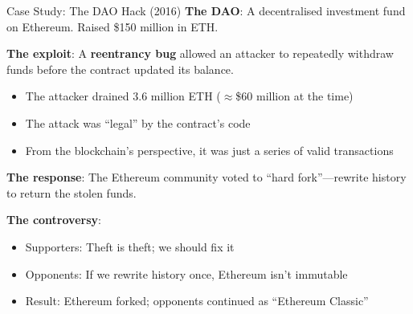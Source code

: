 \documentclass[10pt]{beamer}
\newcommand{\highlight}[1]{\textcolor{AccentOrange}{\textbf{#1}}}
\begin{document}
\begin{frame}{Case Study: The DAO Hack (2016)}
  \textbf{The DAO}: A decentralised investment fund on Ethereum. Raised \$150 million in ETH.
  
  \vspace{1em}
  \textbf{The exploit}: A \highlight{reentrancy bug} allowed an attacker to repeatedly withdraw funds before the contract updated its balance.
  
  \vspace{0.5em}
  \begin{itemize}
    \item The attacker drained 3.6 million ETH ($\approx$\$60 million at the time)
    \item The attack was ``legal'' by the contract's code
    \item From the blockchain's perspective, it was just a series of valid transactions
  \end{itemize}
  
  \vspace{1em}
  \textbf{The response}: The Ethereum community voted to ``hard fork''---rewrite history to return the stolen funds.
  
  \vspace{0.5em}
  \textbf{The controversy}:
  \begin{itemize}
    \item Supporters: Theft is theft; we should fix it
    \item Opponents: If we rewrite history once, Ethereum isn't immutable
    \item Result: Ethereum forked; opponents continued as ``Ethereum Classic''
  \end{itemize}
\end{frame}
\end{document}
